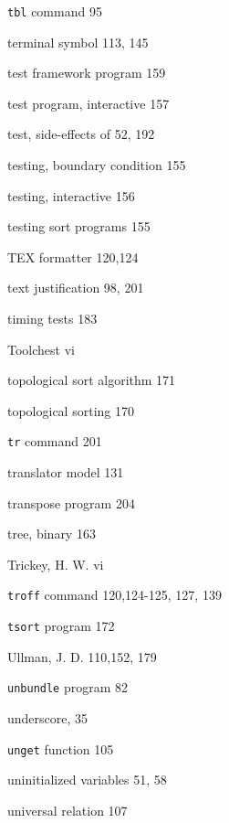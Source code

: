 \begin{multicols}{3}
\hangindent=3pc  \verb'tbl' command 95

\hangindent=3pc  terminal symbol 113, 145

\hangindent=3pc  test framework program 159

\hangindent=3pc  test program, interactive 157

\hangindent=3pc  test, side-effects of 52, 192

\hangindent=3pc  testing, boundary condition 155

\hangindent=3pc  testing, interactive 156

\hangindent=3pc  testing sort programs 155

\hangindent=3pc  TEX formatter 120,124

\hangindent=3pc  text justification 98, 201

\hangindent=3pc  timing tests 183

\hangindent=3pc  Toolchest vi

\hangindent=3pc  topological sort algorithm 171

\hangindent=3pc  topological sorting 170

\hangindent=3pc  \verb'tr' command 201

\hangindent=3pc  translator model 131

\hangindent=3pc  transpose program 204

\hangindent=3pc  tree, binary 163

\hangindent=3pc  Trickey, H. W. vi

\hangindent=3pc  \verb'troff' command 120,124-125, 127, 139

\hangindent=3pc  \verb'tsort' program 172





\hangindent=3pc  Ullman, J. D. 110,152, 179

\hangindent=3pc  \verb'unbundle' program 82

\hangindent=3pc  underscore, 35

\hangindent=3pc  \verb'unget' function 105

\hangindent=3pc  uninitialized variables 51, 58

\hangindent=3pc  universal relation 107


\end{multicols}
